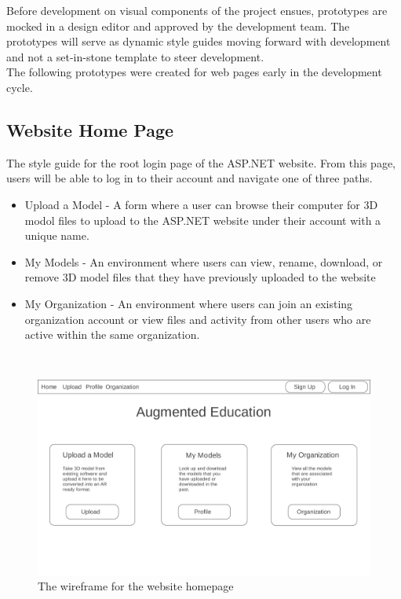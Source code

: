 \hspace{7mm}
Before development on visual components of the project ensues, prototypes are mocked in a
design editor and approved by the development team.  The prototypes will serve
as dynamic style guides moving forward with development and not a set-in-stone template
to steer development.\\

The following prototypes were created for web pages early in the development cycle.

\subsection{Website Home Page}
    \hspace{7mm} The style guide for the root login page of the ASP.NET website.
    From this page, users will be able to log in to their account and navigate 
    one of three paths.
        \begin{itemize} 
            \item Upload a Model -
                A form where a user can browse their computer for 3D modol files to
                upload to the ASP.NET website under their account with a unique name. 
            \item My Models - 
                An environment where users can view, rename, download, or remove
                3D model files that they have previously uploaded to the website
            \item My Organization -
                An environment where users can join an existing organization account
                or view files and activity from other users who are active within 
                the same organization.
        \end{itemize}
    \ \\
    \label{fig:proto_web_home}
    \begin{figure}[H]
        \centering \includegraphics[width=0.6\linewidth]{Home}
        \caption{The wireframe for the website homepage}
    \end{figure}

